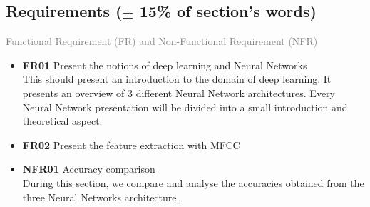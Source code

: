 \subsection{Requirements ($\pm$ 15\% of section's words)}

\textcolor{gray}{Functional Requirement (FR) and Non-Functional Requirement
  (NFR)} 
\begin{itemize} 
  \item \textbf{FR01} Present the notions of deep learning and Neural Networks\\
    This should present an introduction to the domain of deep learning. It
    presents an overview of 3 different Neural Network architectures.  Every
    Neural Network presentation will be divided into a small introduction and
    theoretical aspect.\\
  \item \textbf{FR02} Present the feature extraction with MFCC \\
  \item \textbf{NFR01} Accuracy comparison\\
    During this section, we compare and analyse the accuracies obtained from the
    three Neural Networks architecture.
\end{itemize}
